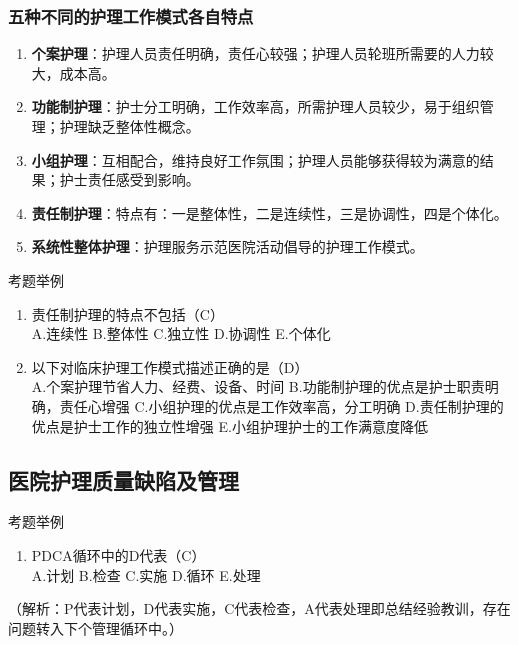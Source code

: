 \documentclass[11pt, a4paper]{ctexart}
\begin{document}
\subsubsection{五种不同的护理工作模式各自特点}
\begin{enumerate}
    \item \textbf{个案护理}：护理人员责任明确，责任心较强；护理人员轮班所需要的人力较大，成本高。
    \item \textbf{功能制护理}：护士分工明确，工作效率高，所需护理人员较少，易于组织管理；护理缺乏整体性概念。
    \item \textbf{小组护理}：互相配合，维持良好工作氛围；护理人员能够获得较为满意的结果；护士责任感受到影响。
    \item \textbf{责任制护理}：特点有：一是整体性，二是连续性，三是协调性，四是个体化。
    \item \textbf{系统性整体护理}：护理服务示范医院活动倡导的护理工作模式。
\end{enumerate}

\begin{examplebox}{考题举例}
\begin{enumerate}
    \item 责任制护理的特点不包括（C）\\
    A.连续性 \quad B.整体性 \quad C.独立性 \quad D.协调性 \quad E.个体化
    \item 以下对临床护理工作模式描述正确的是（D）\\
    A.个案护理节省人力、经费、设备、时间 \quad B.功能制护理的优点是护士职责明确，责任心增强 \quad C.小组护理的优点是工作效率高，分工明确 \quad D.责任制护理的优点是护士工作的独立性增强 \quad E.小组护理护士的工作满意度降低
\end{enumerate}
\end{examplebox}

\subsection{医院护理质量缺陷及管理}
\begin{examplebox}{考题举例}
\begin{enumerate}
    \item PDCA循环中的D代表（C）\\
    A.计划 \quad B.检查 \quad C.实施 \quad D.循环 \quad E.处理
\end{enumerate}
（解析：P代表计划，D代表实施，C代表检查，A代表处理即总结经验教训，存在问题转入下个管理循环中。）
\end{examplebox}
\end{document}
